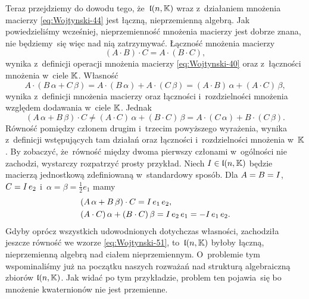 \documentclass[a4paper,11pt]{article}
\begin{document}
Teraz przejdziemy do dowodu tego, że~$\mathfrak{l}( n, \mathbb{K} )$ wraz z~działaniem
mnożenia macierzy \eqref{eq:Wojtynski-44} jest łączną, nieprzemienną
algebrą. Jak powiedzieliśmy wcześniej, nieprzemienność mnożenia macierzy
jest dobrze znana, nie będziemy~się więc nad nią zatrzymywać. Łączność
mnożenia macierzy
\begin{equation}
  \label{eq:Wojtynski-49}
  ( A \cdot B ) \cdot C = A \cdot ( B \cdot C ),
\end{equation}
wynika z~definicji operacji mnożenia macierzy \eqref{eq:Wojtynski-40} oraz
z~łączności mnożenia w~ciele $\mathbb{K}$. Własność
\begin{equation}
  \label{eq:Wojtynski-50}
  A \cdot ( B \, \alpha + C \, \beta ) = A \cdot ( B \, \alpha ) + A \cdot ( C \, \beta ) =
  ( A \cdot B ) \, \alpha + ( A \cdot C ) \, \beta,
\end{equation}
wynika z~definicji mnożenia macierzy oraz łączności i~rozdzielności
mnożenia względem dodawania w~ciele $\mathbb{K}$. Jednak
\begin{equation}
  \label{eq:Wojtynski-51}
  ( A \, \alpha + B \, \beta ) \cdot C \neq
  ( A \cdot C ) \, \alpha + ( B \cdot C ) \, \beta =
  A \cdot ( C \, \alpha ) + B \cdot ( C \, \beta ).
\end{equation}
Równość pomiędzy członem drugim i~trzecim powyższego wyrażenia, wynika
z~definicji wstępujących tam działań oraz łączności i~rozdzielności
mnożenia w~$\mathbb{K}$. By zobaczyć, że~równość między dwoma pierwszy członami
w~ogólności nie zachodzi, wystarczy rozpatrzyć prosty przykład. Niech
$I \in \mathfrak{l}( n, \mathbb{K} )$ będzie macierzą jednostkową zdefiniowaną
w~standardowy sposób. Dla $A = B = I$, $C = I \, e_{ 2 }$
i~$\alpha = \beta = \frac{ 1 }{ 2 } e_{ 1 }$ mamy
\begin{subequations}
  \begin{align}
    \label{eq:Wojtynski-52-A}
    &( A \, \alpha + B \, \beta ) \cdot C = I \, e_{ 1 } \, e_{ 2 }, \\
    \label{eq:Wojtynski-52-B}
    &( A \cdot C ) \, \alpha + ( B \cdot C ) \, \beta = I \, e_{ 2 } \, e_{ 1 } =
      -I \, e_{ 1 } \, e_{ 2 }.
  \end{align}
\end{subequations}
Gdyby oprócz wszystkich udowodnionych dotychczas własności, zachodziła
jeszcze równość we wzorze \eqref{eq:Wojtynski-51}, to~$\mathfrak{l}( n, \mathbb{K} )$
byłoby łączną, nieprzemienną algebrą nad ciałem nieprzemiennym.
O~problemie tym wspominaliśmy już na początku naszych rozważań nad
strukturą algebraiczną zbiorów $\mathfrak{l}( n, \mathbb{K} )$. Jak widać po tym
przykładzie, problem ten pojawia~się bo mnożenie kwaternionów nie jest
przemienne.
\end{document}

